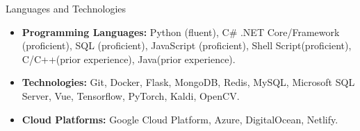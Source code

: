 \documentclass[]{mcdowellcv}
\begin{document}
	\begin{cvsection}{Languages and Technologies}
		\begin{cvsubsection}{}{}{}	
			\begin{itemize}
				\item \textbf{Programming Languages:}  Python (fluent), C\# .NET Core/Framework (proficient), SQL (proficient), JavaScript (proficient), Shell Script(proficient), C/C++(prior experience), Java(prior experience).
				\item \textbf{Technologies:}  Git, Docker, Flask, MongoDB, Redis, MySQL, Microsoft SQL Server, Vue, Tensorflow, PyTorch, Kaldi, OpenCV.
				\item \textbf{Cloud Platforms:}  Google Cloud Platform, Azure, DigitalOcean, Netlify.
			\end{itemize}
		\end{cvsubsection}
	\end{cvsection}
	
\end{document}
